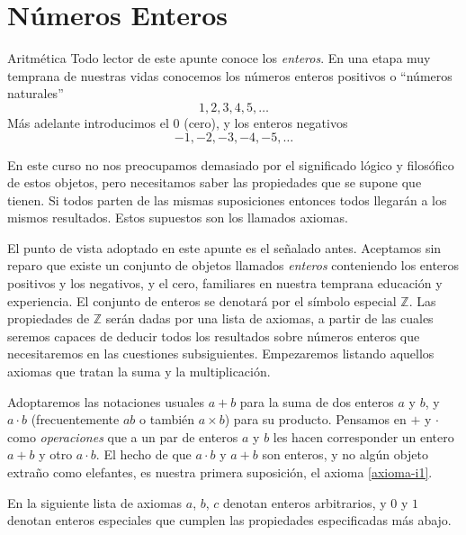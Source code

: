 \chapter[Números Enteros]{Números Enteros}\label{cap.numeros_enteros}

\begin{section}{Aritmética}\label{seccion-aritmetica}
 Todo lector de este apunte conoce los \textit{enteros}. En una etapa muy temprana de nuestras vidas conocemos los números enteros positivos o ``números naturales'' $$1,2,3,4,5,\ldots$$ Más adelante introducimos el $0$ (cero), y los enteros negativos $$ -1,-2,-3,-4,-5,\ldots $$ 

En este curso no nos preocupamos demasiado por el significado lógico y filosófico de estos objetos, pero necesitamos saber las propiedades que se supone que tienen. Si todos parten de las mismas suposiciones entonces todos llegarán a los mismos resultados. Estos supuestos son los llamados axio\-mas.

El punto de vista adoptado en este apunte es el señalado antes. Aceptamos sin reparo que existe un conjunto de objetos llamados \textit{enteros} conteniendo los enteros positivos y los negativos, y el cero, familiares en nuestra temprana educación y experiencia. El conjunto de enteros se denotará por el símbolo especial ${\mathbb Z}$. Las propiedades de ${\mathbb Z}$ serán dadas por una lista de axiomas, a partir de las cuales seremos capaces de deducir todos los resultados sobre números enteros que necesitaremos en las cuestiones subsiguientes. Empezaremos listando aquellos axiomas que tratan la suma y la multiplicación.

Adoptaremos las notaciones usuales $a+b$ para la suma de dos enteros $a$ y $b$, y $a \cdot b$ (frecuentemente $ab$ o también $a \times b$) para su producto. Pensamos en $+$ y $\cdot$ como \textit{operaciones} que a un par de enteros $a$ y $b$ les hacen corresponder un entero $a+b$ y otro $a\cdot b$. El hecho de que $a \cdot b$ y $a+b$ son enteros, y no algún objeto extra\~no como elefantes, es nuestra primera suposición, el axioma \ref{axioma-i1}.     

En la siguiente lista de axiomas $a$, $b$, $c$ denotan enteros arbitrarios, y $0$ y $1$ denotan enteros especiales que cumplen las propiedades especificadas más abajo.


\end{section}
